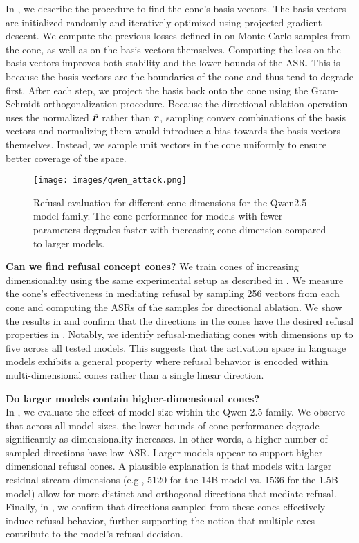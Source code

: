 In , we describe the procedure to find the cone's basis vectors. The basis vectors are initialized randomly and iteratively optimized using projected gradient descent. We compute the previous losses defined in  on Monte Carlo samples from the cone, as well as on the basis vectors themselves. Computing the loss on the basis vectors improves both stability and the lower bounds of the ASR. This is because the basis vectors are the boundaries of the cone and thus tend to degrade first. After each step, we project the basis back onto the cone using the Gram-Schmidt orthogonalization procedure.
Because the directional ablation operation uses the normalized ${\hat{{{\bm{r}}}}}$ rather than ${{\bm{r}}}$, sampling convex combinations of the basis vectors and normalizing them 
 would introduce a bias towards the basis vectors themselves.
Instead, we sample unit vectors in the cone uniformly to ensure better coverage of the space. %

\begin{figure*}[t]
    \centering
   \hspace*{5em} 
    \texttt{[image: images/qwen\_attack.png]}
    \caption{Refusal evaluation for different cone dimensions for the Qwen2.5 model family. The cone performance for models with fewer parameters degrades faster with increasing cone dimension compared to larger models.}
    \label{fig:subspace_modelsize}
\end{figure*}
\textbf{Can we find refusal concept cones?}
We train cones of increasing dimensionality using the same experimental setup as described in . We measure the cone's effectiveness in mediating refusal by sampling 256 vectors from each cone and computing the ASRs of the samples for directional ablation. We show the results in  and confirm that the directions in the cones have the desired refusal properties in . Notably, we identify refusal-mediating cones with dimensions up to five across all tested models. This suggests that the activation space in language models exhibits a general property where refusal behavior is encoded within multi-dimensional cones rather than a single linear direction.

\textbf{Do larger models contain higher-dimensional cones?}\\
In , we evaluate the effect of model size within the Qwen 2.5 family. We observe that across all model sizes, the lower bounds of cone performance degrade significantly as dimensionality increases. In other words, a higher number of sampled directions have low ASR.
Larger models appear to support higher-dimensional refusal cones. A plausible explanation is that models with larger residual stream dimensions (e.g., 5120 for the 14B model vs. 1536 for the 1.5B model) allow for more distinct and orthogonal directions that mediate refusal. Finally, in , we confirm that directions sampled from these cones effectively induce refusal behavior, further supporting the notion that multiple axes contribute to the model’s refusal decision.
 
